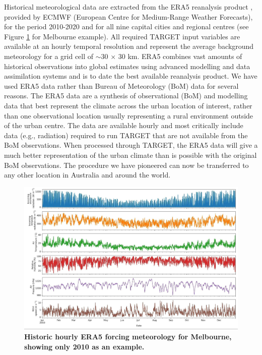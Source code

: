 \documentclass[final,3p,times,authoryear]{elsarticle}
\begin{document}
Historical meteorological data are extracted from the ERA5 reanalysis product \citep{Hersbach2020}, provided by ECMWF (European Centre for Medium-Range Weather Forecasts), for the period 2010-2020 and for all nine capital cities and regional centres (see Figure \ref{fig:mel_era5} for Melbourne example). All required TARGET input variables are available at an hourly temporal resolution and represent the average background meteorology for a grid cell of $\sim$30 $\times$ 30 km. ERA5 combines vast amounts of historical observations into global estimates using advanced modelling and data assimilation systems and is to date the best available reanalysis product. We have used ERA5 data rather than Bureau of Meteorology (BoM) data for several reasons. The ERA5 data are a synthesis of observational (BoM) and modelling data that best represent the climate across the urban location of interest, rather than one observational location usually representing a rural environment outside of the urban centre. The data are available hourly and most critically include data (e.g., radiation) required to run TARGET that are not available from the BoM observations. When processed through TARGET, the ERA5 data will give a much better representation of the urban climate than is possible with the original BoM observations. The procedure we have pioneered can now be transferred to any other location in Australia and around the world.

\begin{figure}
\centering
\includegraphics[trim={0 0 0 0},clip,scale=0.15]{images/image1.jpg}
\caption{\bf Historic hourly ERA5 forcing meteorology for Melbourne, showing only 2010 as an example.}
 \label{fig:mel_era5}
\end{figure}
\end{document}

